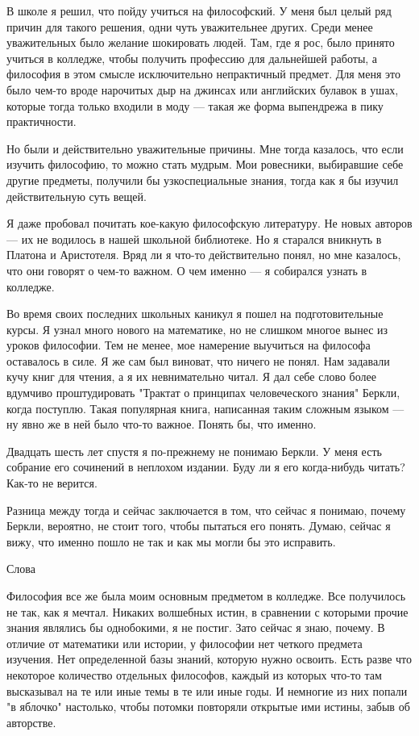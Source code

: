 \documentclass[ebook,12pt,oneside,openany]{memoir}
\date{}
\begin{document}
\maketitle

В школе я решил, что пойду учиться на философский. У меня был целый
ряд причин для такого решения, одни чуть уважительнее других. Среди
менее уважительных было желание шокировать людей. Там, где я рос, было
принято учиться в колледже, чтобы получить профессию для дальнейшей
работы, а философия в этом смысле исключительно непрактичный предмет.
Для меня это было чем-то вроде нарочитых дыр на джинсах или английских
булавок в ушах, которые тогда только входили в моду — такая же форма
выпендрежа в пику практичности.

Но были и действительно уважительные причины. Мне тогда казалось, что
если изучить философию, то можно стать мудрым. Мои ровесники,
выбиравшие себе другие предметы, получили бы узкоспециальные знания,
тогда как я бы изучил действительную суть вещей.

Я даже пробовал почитать кое-какую философскую литературу. Не новых
авторов — их не водилось в нашей школьной библиотеке. Но я старался
вникнуть в Платона и Аристотеля. Вряд ли я что-то действительно понял,
но мне казалось, что они говорят о чем-то важном. О чем именно — я
собирался узнать в колледже.

Во время своих последних школьных каникул я пошел на подготовительные
курсы. Я узнал много нового на математике, но не слишком многое вынес
из уроков философии. Тем не менее, мое намерение выучиться на философа
оставалось в силе. Я же сам был виноват, что ничего не понял. Нам
задавали кучу книг для чтения, а я их невнимательно читал. Я дал себе
слово более вдумчиво проштудировать "Трактат о принципах человеческого
знания" Беркли, когда поступлю. Такая популярная книга, написанная
таким сложным языком — ну явно же в ней было что-то важное. Понять бы,
что именно.

Двадцать шесть лет спустя я по-прежнему не понимаю Беркли. У меня есть
собрание его сочинений в неплохом издании. Буду ли я его когда-нибудь
читать? Как-то не верится.

Разница между тогда и сейчас заключается в том, что сейчас я понимаю,
почему Беркли, вероятно, не стоит того, чтобы пытаться его понять.
Думаю, сейчас я вижу, что именно пошло не так и как мы могли бы это
исправить.

Слова

Философия все же была моим основным предметом в колледже. Все
получилось не так, как я мечтал. Никаких волшебных истин, в сравнении
с которыми прочие знания являлись бы однобокими, я не постиг. Зато
сейчас я знаю, почему. В отличие от математики или истории, у
философии нет четкого предмета изучения. Нет определенной базы знаний,
которую нужно освоить. Есть разве что некоторое количество отдельных
философов, каждый из которых что-то там высказывал на те или иные темы
в те или иные годы. И немногие из них попали "в яблочко" настолько,
чтобы потомки повторяли открытые ими истины, забыв об авторстве.
\end{document}
